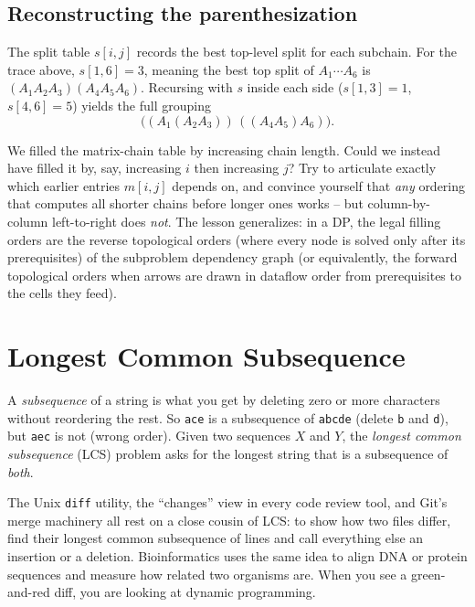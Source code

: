 \subsection{Reconstructing the parenthesization}

The split table $s[i,j]$ records the best top-level split for each subchain. For
the trace above, $s[1,6] = 3$, meaning the best top split of $A_1\cdots A_6$ is
$(A_1 A_2 A_3)(A_4 A_5 A_6)$. Recursing with $s$ inside each side
($s[1,3]=1$, $s[4,6]=5$) yields the full grouping
\[
  \bigl((A_1 (A_2 A_3))\,((A_4 A_5) A_6)\bigr).
\]

\begin{algorithm}[H]
\caption{\textsc{Print-Optimal-Parens}$(s, i, j)$}
\end{algorithm}

\begin{walkbox}
We filled the matrix-chain table by
increasing chain length. Could we instead have filled it by, say, increasing
$i$ then increasing $j$? Try to articulate exactly which earlier entries
$m[i,j]$ depends on, and convince yourself that \emph{any} ordering that
computes all shorter chains before longer ones works -- but column-by-column
left-to-right does \emph{not}. The lesson generalizes: in a DP, the legal
filling orders are the reverse topological orders (where every node is solved only after its prerequisites) of the subproblem
dependency graph (or equivalently, the forward topological orders when arrows
are drawn in dataflow order from prerequisites to the cells they feed).
\end{walkbox}

\section{Longest Common Subsequence}
\label{ch15:lcs}

A \emph{subsequence} of a
string is what you get by deleting zero or more characters without reordering
the rest. So \texttt{ace} is a subsequence of \texttt{abcde} (delete
\texttt{b} and \texttt{d}), but \texttt{aec} is not (wrong order). Given two
sequences $X$ and $Y$, the \emph{longest common subsequence} (LCS) problem asks
for the longest string that is a subsequence of \emph{both}.

\begin{aestheticbox}
The Unix \lstinline|diff| utility, the ``changes''
view in every code review tool, and Git's merge machinery all rest on a close
cousin of LCS: to show how two files differ, find their longest common
subsequence of lines and call everything else an insertion or a deletion.
Bioinformatics uses the same idea to align DNA or protein sequences and measure
how related two organisms are. When you see a green-and-red diff, you are
looking at dynamic programming.
\end{aestheticbox}

